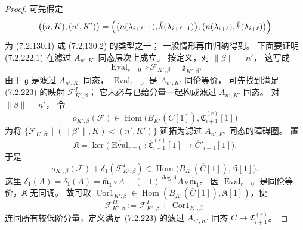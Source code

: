 \begin{proof}
可先假定
\[
\bigl((n,K),(n',K')\bigr)
=\Bigl(
\bigl(\bar n(\lambda_{i+\ell-1}),
\bar k(\lambda_{i+\ell-1})\bigr),
\bigl(\bar n(\lambda_{i+\ell}),
\bar k(\lambda_{i+\ell})\bigr)
\Bigr)
\]
为 (7.2.130.1) 或 (7.2.130.2) 的类型之一；
一般情形再由归纳得到。
下面要证明 (7.2.222.1)
在滤过 $A_{n',K'}$ 同态层次上成立。
按定义，对 $\lVert\beta\rVert=n'$，
这写成
\begin{equation}
\operatorname{Eval}_{r=0}\circ
\mathcal F_{K',\beta}
=\mathfrak g_{K',\beta}.
\tag{7.2.223}\label{eq:7-2-223}
\end{equation}
由于 $\mathfrak g$ 是滤过
$A_{n',K'}$ 同态，
$\operatorname{Eval}_{r=0}$ 是
$A_{n',K'}$ 同伦等价，
可先找到满足 (7.2.223) 的映射
$\mathcal F^I_{K',\beta}$；
它未必与已给分量一起构成滤过
$A_{n',K'}$ 同态。
对 $\lVert\beta\rVert=n'$，
令
\[
o_{K',\beta}(\mathcal F)
\in\operatorname{Hom}
\bigl(B_{K'}(\overline C[1]),
\overline{\mathfrak C}_{i+1}^{(r)}[1]\bigr)
\]
为将
$\{\mathcal F_{K,\beta'}\mid
(\lVert\beta'\rVert,K)<(n',K')\}$
延拓为滤过 $A_{n',K'}$ 同态的障碍圈。
置
\[
\mathfrak K
=\ker\bigl(
\overline{\operatorname{Eval}}_{r=0}
\colon\overline{\mathfrak C}_{i+1}^{(r)}[1]
\longrightarrow\overline C'_{i+1}[1]
\bigr).
\]
于是
\[
o_{K',\beta}(\mathcal F)
+\delta_1(\mathcal F^I_{K',\beta})
\in\operatorname{Hom}
\bigl(B_{K'}(\overline C[1]),\mathfrak K[1]\bigr).
\]
这里
$\delta_1(A)=\overline\delta_1(A)
=\overline{\mathfrak m}_1\circ A
-(-1)^{\deg A}A\circ\widehat{\mathfrak m}_1$。
因 $\overline{\operatorname{Eval}}_{r=0}$
是同伦等价，$\mathfrak K$ 无同调。
故可取
$\operatorname{Cor1}_{K',\beta}\in
\operatorname{Hom}(B_{K'}(\overline C[1]),
\mathfrak K[1])$，使
\[
\mathcal F^{II}_{K',\beta}
:=\mathcal F^I_{K',\beta}
+\operatorname{Cor1}_{K',\beta}
\]
连同所有较低阶分量，定义满足
(7.2.223) 的滤过
$A_{n',K'}$ 同态
$C\to\mathfrak C_{i+1}^{(r)}$。


\end{proof}
